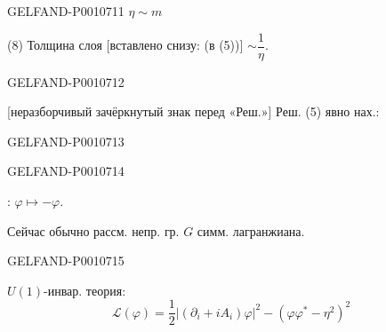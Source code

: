 \begin{GelfandAdjacentEvidence}{GELFAND-P001071}{1}
$\eta\sim m$

(8) Толщина слоя [вставлено снизу: (в (5))] $\sim\dfrac1\eta$.
\end{GelfandAdjacentEvidence}
\begin{GelfandAdjacentEvidence}{GELFAND-P001071}{2}


[неразборчивый зачёркнутый знак перед «Реш.»] Реш. (5) явно нах.: 
\end{GelfandAdjacentEvidence}
\begin{GelfandAdjacentEvidence}{GELFAND-P001071}{3}

\end{GelfandAdjacentEvidence}
\begin{GelfandAdjacentEvidence}{GELFAND-P001071}{4}


: $\varphi\mapsto-\varphi$.

Сейчас обычно рассм. непр. гр. $G$ симм. лагранжиана.
\end{GelfandAdjacentEvidence}
\begin{GelfandAdjacentEvidence}{GELFAND-P001071}{5}


$U(1)$-инвар. теория:
\begin{equation*}
\mathcal{L}(\varphi)=\frac12\bigl|(\partial_i+iA_i)\varphi\bigr|^2-(\varphi\varphi^*-\eta^2)^2
\tag{9}
\end{equation*}
\end{GelfandAdjacentEvidence}
